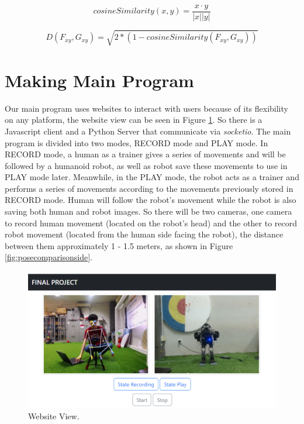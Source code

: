 \begin{equation}
  \label{eq:cosinesimilarity}
  cosineSimilarity(x,y) = \frac{x \cdot y}{|x||y|}
\end{equation}

\begin{equation}
  \label{eq:euclideandistance}
  D(F_{xy}, G_{xy}) = \sqrt{2 * (1 - cosineSimilarity(F_{xy}, G_{xy}))}
\end{equation}



\section{Making Main Program}
\label{sec:makingmainprogram}

Our main program uses websites to interact with users because of its flexibility on any platform, the website view can be seen in Figure \ref{fig:websiteview}. So there is a Javascript client and a Python Server that communicate via \emph{socketio}.
The main program is divided into two modes, RECORD mode and PLAY mode. In RECORD mode, a human as a trainer gives a series of movements and will be followed by a humanoid robot, as well as robot save these movements to use in PLAY mode later.
Meanwhile, in the PLAY mode, the robot acts as a trainer and performs a series of movements according to the movements previously stored in RECORD mode. Human will follow the robot's movement while the robot is also saving both human and robot images.
So there will be two cameras, one camera to record human movement (located on the robot's head) and the other to record robot movement (located from the human side facing the robot), the distance between them approximately 1 - 1.5 meters, as shown in Figure \ref{fig:posecomparisonside}.
\begin{figure}[ht]
  \centering
  \includegraphics[scale=0.76]{gambar/web.png}
  \caption{Website View.}
  \label{fig:websiteview}
\end{figure}

